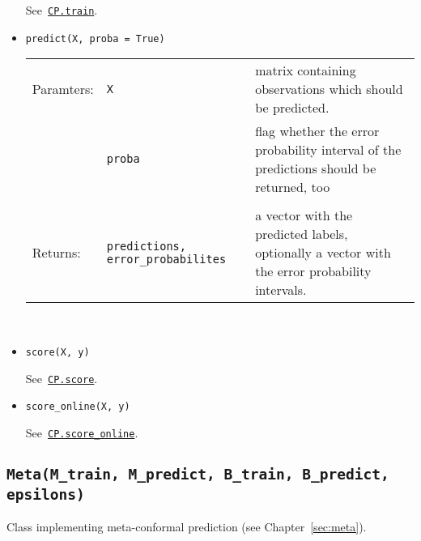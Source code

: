 \documentclass[twoside,11pt]{article}
\def\wo{~\\}
\begin{document}
\begin{appendices}
\begin{itemize}
          See~\hyperref[itm:cp_train]
          {\texttt{CP.train}}.
          \\

        \item
          \texttt{predict(X, proba = True)}
          \label{itm:cp_predict}

          \begin{tabu}{lp{4cm}X}
            Paramters: &\texttt{X}
                       &matrix containing observations
                        which should be predicted.
                        \\
                       &\texttt{proba}
                       &flag whether the error probability
                        interval of the predictions should
                        be returned, too
                        \\\\
            Returns:   &\texttt{predictions,
                                error\_probabilites}
                       &a vector with the predicted labels,
                        optionally a vector with the
                        error probability intervals.
          \end{tabu}
          \wo

        \item
          \texttt{score(X, y)}

          See~\hyperref[itm:cp_score]
          {\texttt{CP.score}}.
          \\

        \item
          \texttt{score\_online(X, y)}

          See~\hyperref[itm:cp_score_online]
          {\texttt{CP.score\_online}}.

      \end{itemize}

    \subsection*{\texttt{Meta(M\_train, M\_predict,
                 B\_train, B\_predict, epsilons)}}

      Class implementing meta-conformal prediction
      (see Chapter~\ref{sec:meta}).
      \\


\end{appendices}
\end{document}
